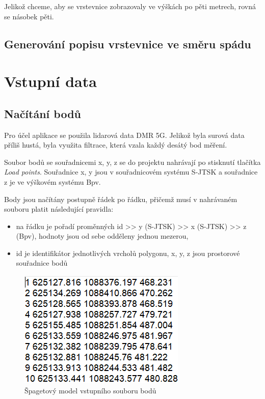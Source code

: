 \documentclass[11pt]{article}
\begin{document}
Jelikož chceme, aby se vrstevnice zobrazovaly ve výškách po pěti metrech, rovná se násobek pěti.


\subsection{Generování popisu vrstevnice ve směru spádu}
\clearpage



\section{Vstupní data}
\subsection{Načítání bodů}

Pro účel aplikace se použila lidarová data DMR 5G. Jelikož byla surová data příliš hustá, byla využita filtrace, která vzala každý desátý bod měření. 

Soubor bodů se souřadnicemi x, y, z se do projektu nahrávají po stisknutí  tlačítka \textit{Load points}. Souřadnice x, y jsou v  souřadnicovém systému S-JTSK a souřadnice z je ve výškovém systému Bpv.

Body jsou načítány postupně řádek po řádku, přičemž musí v nahrávaném souboru platit následující pravidla:    

\begin{itemize}
\item na řádku je pořadí proměnných id >> y (S-JTSK) >> x (S-JTSK)  >> z (Bpv),  hodnoty jsou od sebe odděleny  jednou mezerou,
\item id je identifikátor jednotlivých vrcholů polygonu, x, y, z jsou prostorové souřadnice bodů

\end{itemize}

\begin{figure}[htbh]
	\centering	\includegraphics[scale=1]{images/vstup.png} 
	\caption{Špagetový model vstupního souboru bodů}
	\label{fig:vstup.}
\end{figure} 
\end{document}
